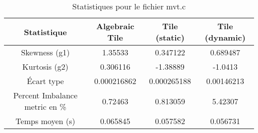\documentclass{article}
\begin{document}
\begin{table}[htbp]
  \centering
  \caption{Statistiques pour le fichier mvt.c}
  \begin{tabular}{|c|c|c|c|}
    \hline
    Statistique & Algebraic Tile & Tile (static) & Tile (dynamic) \\ 
    \hline
    Skewness (g1) & 1.35533 & 0.347122 & 0.689487 \\ 
    Kurtosis (g2) & 0.306116 & -1.38889 & -1.0413 \\ 
    Écart type & 0.000216862 & 0.000265188 & 0.00146213\\ 
    Percent Imbalance metric en \% & 0.72463 & 0.813059 & 5.42307\\ 
    Temps moyen (s) & 0.065845 & 0.057582 & 0.056731 \\ 
    \hline
  \end{tabular}
\end{table}
\newpage

  
\end{document}

